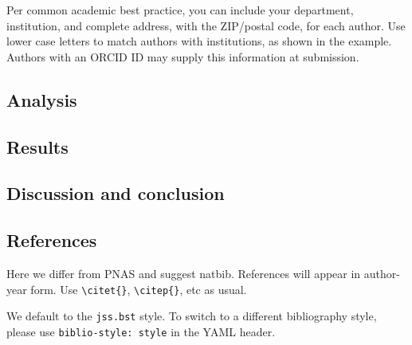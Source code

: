 \documentclass[letterpaper,9pt,twocolumn,twoside,]{pinp}
\begin{document}
Per common academic best practice, you can include your department,
institution, and complete address, with the ZIP/postal code, for each
author. Use lower case letters to match authors with institutions, as
shown in the example. Authors with an ORCID ID may supply this
information at submission.

\hypertarget{analysis}{%
\subsection{Analysis}\label{analysis}}

\hypertarget{results}{%
\subsection{Results}\label{results}}

\hypertarget{discussion-and-conclusion}{%
\subsection{Discussion and conclusion}\label{discussion-and-conclusion}}

\hypertarget{references}{%
\subsection{References}\label{references}}

Here we differ from PNAS and suggest natbib. References will appear in
author-year form. Use \texttt{\textbackslash{}citet\{\}},
\texttt{\textbackslash{}citep\{\}}, etc as usual.

We default to the \texttt{jss.bst} style. To switch to a different
bibliography style, please use \texttt{biblio-style:\ style} in the YAML
header.

\showacknow




\end{document}
